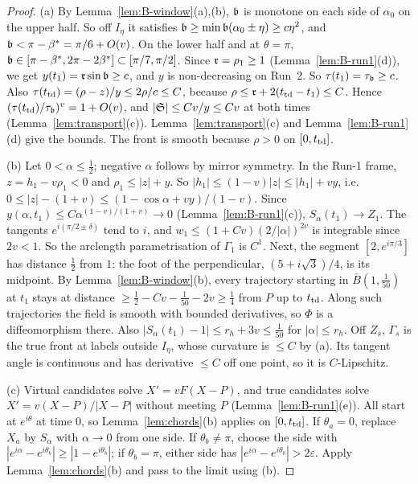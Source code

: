 \begin{proof}
(a) By Lemma~\ref{lem:B-window}(a),(b), $\mathfrak{b}$ is monotone on each side of $\alpha_0$ on the upper half. So off $I_\eta$ it satisfies
$\mathfrak{b}\ge\min\mathfrak{b}(\alpha_0\pm\eta)\ge c\eta^2$, and $\mathfrak{b}<\pi-\beta^*=\pi/6+O(v)$. On the lower half and at $\theta=\pi$,
$\mathfrak{b}\in[\pi-\beta^*,2\pi-2\beta^*]\subset[\pi/7,\pi/2]$. Since $\mathfrak{r}=\rho_1\ge1$ (Lemma~\ref{lem:B-run1}(d)), we get
$y(t_1)=\mathfrak{r}\sin\mathfrak{b}\ge c$, and $y$ is non-decreasing on Run~2. So $\tau(t_1)=\tau_{\mathfrak{b}}\ge c$. Also
$\tau(t_{\mathrm{td}})=(\rho-z)/y\le2\rho/c\le C$, because $\rho\le\mathfrak{r}+2(t_{\mathrm{td}}-t_1)\le C$. Hence $(\tau(t_{\mathrm{td}})/\tau_{\mathfrak{b}})^v=1+O(v)$, and
$|\mathfrak{S}|\le Cv/y\le Cv$ at both times (Lemma~\ref{lem:transport}(c)). Lemma~\ref{lem:transport}(c) and Lemma~\ref{lem:B-run1}(d) give
the bounds. The front is smooth because $\rho>0$ on $[0,t_{\mathrm{td}}]$.

(b) Let $0<\alpha\le\frac12$; negative $\alpha$ follows by mirror symmetry. In the Run-1 frame, $z=h_1-v\rho_1<0$ and $\rho_1\le|z|+y$.
So $|h_1|\le(1-v)|z|\le|h_1|+vy$, i.e.\ $0\le|z|-(1+v)\le(1-\cos\alpha+vy)/(1-v)$. Since $y(\alpha,t_1)\le C\alpha^{(1-v)/(1+v)}\to0$
(Lemma~\ref{lem:B-run1}(c)), $S_\alpha(t_1)\to Z_1$. The tangents $e^{i(\pi/2\pm\delta)}$ tend to $i$, and
$w_1\le(1+Cv)(2/|\alpha|)^{2v}$ is integrable since $2v<1$. So the arclength parametrisation of $\Gamma_1$ is $C^1$.
Next, the segment $[2,e^{i\pi/3}]$ has distance $\frac12$ from $1$: the foot of the perpendicular, $(5+i\sqrt3)/4$, is its midpoint.
By Lemma~\ref{lem:B-window}(b), every trajectory starting in $\bar B(1,\frac1{50})$ at $t_1$ stays at distance
$\ge\frac12-Cv-\frac1{50}-2v\ge\frac14$ from $P$ up to $t_{\mathrm{td}}$. Along such trajectories the field is smooth with bounded
derivatives, so $\Phi$ is a diffeomorphism there. Also $|S_\alpha(t_1)-1|\le r_h+3v\le\frac1{50}$ for $|\alpha|\le r_h$. Off $Z_s$,
$\Gamma_s$ is the true front at labels outside $I_\eta$, whose curvature is $\le C$ by (a). Its tangent angle is continuous and has
derivative $\le C$ off one point, so it is $C$-Lipschitz.

(c) Virtual candidates solve $X'=vF(X-P)$, and true candidates solve $X'=v(X-P)/|X-P|$ without meeting $P$
(Lemma~\ref{lem:B-run1}(e)). All start at $e^{i\theta}$ at time $0$, so Lemma~\ref{lem:chords}(b) applies on $[0,t_{\mathrm{td}}]$. If
$\theta_a=0$, replace $X_a$ by $S_\alpha$ with $\alpha\to0$ from one side. If $\theta_b\neq\pi$, choose the side with
$|e^{i\alpha}-e^{i\theta_b}|\ge|1-e^{i\theta_b}|$; if $\theta_b=\pi$, either side has $|e^{i\alpha}-e^{i\theta_b}|>2\varepsilon$. Apply
Lemma~\ref{lem:chords}(b) and pass to the limit using (b).
\end{proof}

